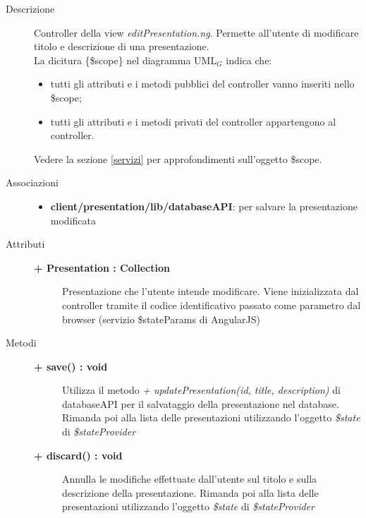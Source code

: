 \begin{description}
\item[Descrizione] \hfill
	Controller della view \textit{editPresentation.ng}. Permette all'utente di modificare titolo e descrizione di una presentazione.
\\ La dicitura \{\$scope\} nel diagramma UML$_G$ indica che:
\begin{itemize}
\item tutti gli attributi e i metodi pubblici del controller vanno inseriti nello \$scope;
\item tutti gli attributi e i metodi privati del controller appartengono al controller.
\end{itemize}
Vedere la sezione \ref{servizi} per approfondimenti sull'oggetto \$scope.
	

\item[Associazioni] \hfill
	\begin{itemize}
		\item \textbf{client/presentation/lib/databaseAPI}: per salvare la presentazione modificata
	\end{itemize}

	
\item[Attributi] \hfill
	\begin{description}
		\item[\textbf{+ Presentation : Collection			}] \hfill
			Presentazione che l'utente intende modificare. Viene inizializzata dal controller tramite il codice identificativo passato come parametro dal browser (servizio \$stateParams di AngularJS)
	\end{description}
	
	
\item[Metodi] \hfill

	\begin{description}
		\item[\textbf{\color{blue}+ save() : void			}] \hfill
			Utilizza il metodo \textit{+ updatePresentation(id, title, description)} di databaseAPI per il salvataggio della presentazione nel database. Rimanda poi alla lista delle presentazioni utilizzando l'oggetto \textit{\$state} di \textit{\$stateProvider}
	\end{description}
	
	\begin{description}
		\item[\textbf{\color{blue}+ discard() : void			}] \hfill
			Annulla le modifiche effettuate dall'utente sul titolo e sulla descrizione della presentazione. Rimanda poi alla lista delle presentazioni utilizzando l'oggetto \textit{\$state} di \textit{\$stateProvider}
	\end{description}
	
	
	
\end{description}

